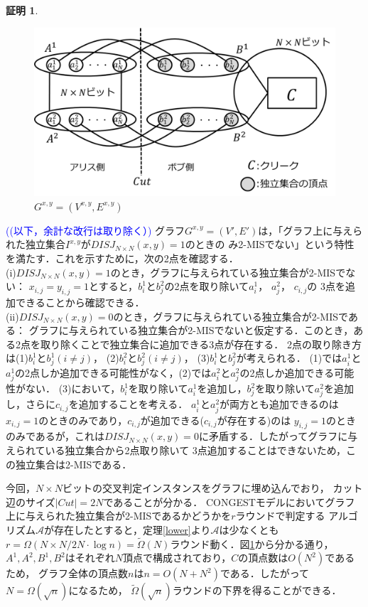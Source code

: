 \documentclass[12pt]{thesis}
\newcommand{\Izumi}[1]{\textcolor{blue}{(#1)}}
\newcommand{\CONGEST}{\textsf{CONGEST}}
\theoremstyle{definition}
\newtheorem*{prf*}{証明}
\begin{document}
\begin{prf*}
\begin{figure}[ht]
\begin{center}
\includegraphics[width=120mm]{2_Gxy.png}
\end{center}
\caption{$G^{x, y} = (V^{x,y}, E^{x,y})$}
\label{2_G(x,y)}
\end{figure}

\Izumi{(以下，余計な改行は取り除く）}
グラフ$G^{x, y} = (V', E')$は，「グラフ上に与えられた独立集合$I^{x,y}$が$DISJ_{N \times N} (x, y) = 1$のときの
み2-MISでない」という特性を満たす．これを示すために，次の2点を確認する． \\
(i)$DISJ_{N \times N} (x, y) = 1$のとき，グラフに与えられている独立集合が2-MISでない： 
$x_{i, j} = y_{i, j} =1$とすると，$b_{i}^{1}$と$b_{j}^{2}$の2点を取り除いて$a_{i}^{1}$， $a_{j}^{2}$， $c_{i, j}$の
3点を追加できることから確認できる． \\
(ii)$DISJ_{N \times N} (x, y) = 0$のとき，グラフに与えられている独立集合が2-MISである： 
グラフに与えられている独立集合が2-MISでないと仮定する．このとき，ある2点を取り除くことで独立集合に追加できる3点が存在する．
2点の取り除き方は(1)$b_{i}^{1}$と$b_{j}^{1}(i \neq j)$， (2)$b_{i}^{2}$と$b_{j}^{2}(i \neq j)$， (3)$b_{i}^{1}$と$b_{j}^{2}$が考えられる．
(1)では$a_{i}^{1}$と$a_{j}^{1}$の2点しか追加できる可能性がなく，(2)では$a_{i}^{2}$と$a_{j}^{2}$の2点しか追加できる可能性がない．
(3)において，$b_{i}^{1}$を取り除いて$a_{i}^{1}$を追加し，$b_{j}^{2}$を取り除いて$a_{j}^{2}$を追加し，さらに$c_{i, j}$を追加することを考える．
$a_{i}^{1}$と$a_{j}^{2}$が両方とも追加できるのは$x_{i, j} = 1$のときのみであり，$c_{i, j}$が追加できる($c_{i, j}$が存在する)のは
$y_{i, j} = 1$のときのみであるが，これは$DISJ_{N \times N} (x, y) = 0$に矛盾する．したがってグラフに与えられている独立集合から2点取り除いて
3点追加することはできないため，この独立集合は2-MISである．

今回，$N \times N$ビットの交叉判定インスタンスをグラフに埋め込んでおり，
カット辺のサイズ$|Cut| = 2N$であることが分かる．
{\CONGEST}モデルにおいてグラフ上に与えられた独立集合が2-MISであるかどうかを$r$ラウンドで判定する
アルゴリズム$\mathcal{A}$が存在したとすると，定理\ref{lower}より$\mathcal{A}$は少なくとも
$r = \Omega (N \times N/ 2N \cdot \log n) = \tilde{\Omega}(N)$ラウンド動く．図\ref{2_G(x,y)}から分かる通り，
$A^{1}, A^{2}, B^{1}, B^{2}$はそれぞれ$N$頂点で構成されており，$C$の頂点数は$O(N^{2})$であるため，
グラフ全体の頂点数$n$は$n = O(N + N^{2})$である．したがって$N = \Omega(\sqrt{n})$になるため，
$\tilde{\Omega}(\sqrt{n})$ラウンドの下界を得ることができる．
\end{prf*}
\newpage
\end{document}
